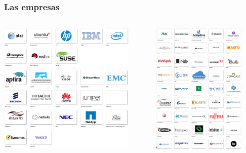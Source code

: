 \begin{frame}
\frametitle{Las empresas}

\begin{columns}[T]
\begin{column}{.55\textwidth}
\includegraphics[width=6.5cm]{figs/openstack-platinum}\\
\vspace{1cm}
\includegraphics[width=6.5cm]{figs/openstack-gold}\\
\end{column}%
\hfill%
\begin{column}{.41\textwidth}
\includegraphics[width=4.5cm]{figs/openstack-silver}
\end{column}%
\end{columns}

\end{frame}





